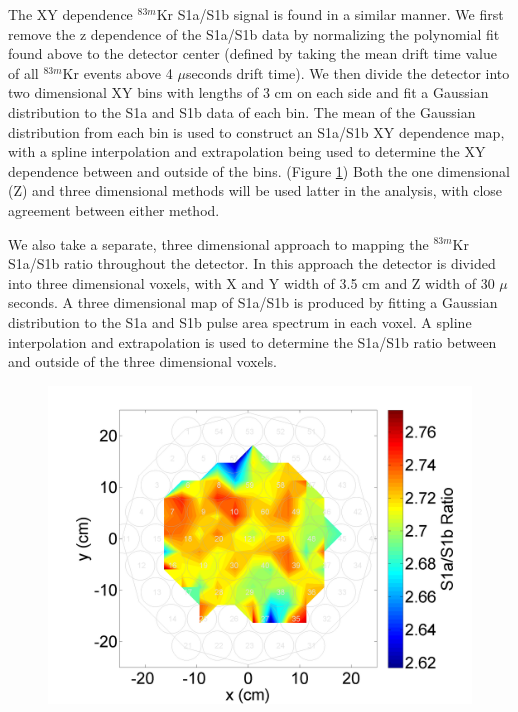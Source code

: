 The XY dependence $^{83m}$Kr S1a/S1b signal is found in a similar manner.  We first remove the z dependence of the S1a/S1b data by normalizing the polynomial fit found above to the detector center (defined by taking the mean drift time value of all $^{83m}$Kr events above 4 $\mu$seconds drift time). We then divide the detector into two dimensional XY bins with lengths of 3 cm on each side and fit a Gaussian distribution to the S1a and S1b data of each bin.  The mean of the Gaussian distribution from each bin is used to construct an S1a/S1b XY dependence map, with a spline interpolation and extrapolation being used to determine the XY dependence between and outside of the bins. (Figure \ref{fig:S1aS1bXYDep})  Both the one dimensional (Z) and three dimensional methods will be used latter in the analysis, with close agreement between either method.


We also take a separate, three dimensional approach to mapping the $^{83m}$Kr S1a/S1b ratio throughout the detector. In this approach the detector is divided into three dimensional voxels, with X and Y width of 3.5 cm and Z width of 30 $\mu$seconds.  A three dimensional map of S1a/S1b is produced by fitting a Gaussian distribution to the S1a and S1b pulse area spectrum in each voxel.  A spline interpolation and extrapolation is used to determine the S1a/S1b ratio between and outside of the three dimensional voxels.

\begin{figure}[!h]
\includegraphics[scale=0.6]{Run04Corrections/S1aS1bvXY.png}
 \label{fig:S1aS1bXYDep}
\end{figure}

